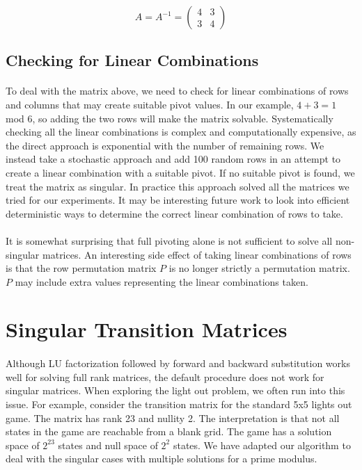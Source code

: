 \documentclass[11pt]{article}
\begin{document}
\[
A = A^{-1} =
\begin{pmatrix}
4 & 3 \\
3 & 4
\end{pmatrix}
\]

\subsection*{Checking for Linear Combinations}

\paragraph{} To deal with the matrix above, we need to check for linear combinations of rows and columns that may create suitable pivot values.  In our example, $4 + 3 = 1$ mod 6, so adding the two rows will make the matrix solvable.  Systematically checking all the linear combinations is complex and computationally expensive, as the direct approach is exponential with the number of remaining rows.  We instead take a stochastic approach and add 100 random rows in an attempt to create a linear combination with a suitable pivot.  If no suitable pivot is found, we treat the matrix as singular.  In practice this approach solved all the matrices we tried for our experiments.  It may be interesting future work to look into efficient deterministic ways to determine the correct linear combination of rows to take.


\paragraph{} It is somewhat surprising that full pivoting alone is not sufficient to solve all non-singular matrices.  An interesting side effect of taking linear combinations of rows is that the row permutation matrix $P$ is no longer strictly a permutation matrix.  $P$ may include extra values representing the linear combinations taken.

\section*{Singular Transition Matrices}

\paragraph{} Although LU factorization followed by forward and backward substitution works well for solving full rank matrices, the default procedure does not work for singular matrices.  When exploring the light out problem, we often run into this issue.  For example, consider the transition matrix for the standard 5x5 lights out game.  The matrix has rank 23 and nullity 2.  The interpretation is that not all states in the game are reachable from a blank grid.  The game has a solution space of $2^23$ states and null space of $2^2$ states.  We have adapted our algorithm to deal with the singular cases with multiple solutions for a prime modulus.
\end{document}

